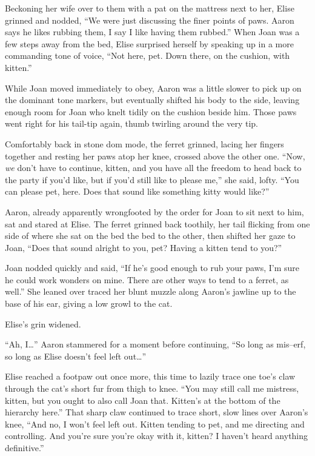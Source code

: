 Beckoning her wife over to them with a pat on the mattress next to her, Elise grinned and nodded, ``We were just discussing the finer points of paws. Aaron says he likes rubbing them, I say I like having them rubbed.'' When Joan was a few steps away from the bed, Elise surprised herself by speaking up in a more commanding tone of voice, ``Not here, pet. Down there, on the cushion, with kitten.''

While Joan moved immediately to obey, Aaron was a little slower to pick up on the dominant tone markers, but eventually shifted his body to the side, leaving enough room for Joan who knelt tidily on the cushion beside him. Those paws went right for his tail-tip again, thumb twirling around the very tip.

Comfortably back in stone dom mode, the ferret grinned, lacing her fingers together and resting her paws atop her knee, crossed above the other one. ``Now, \textit{we} don't have to continue, kitten, and you have all the freedom to head back to the party if you'd like, but if you'd still like to please me,'' she said, lofty. ``You can please pet, here. Does that sound like something kitty would like?''

Aaron, already apparently wrongfooted by the order for Joan to sit next to him, sat and stared at Elise. The ferret grinned back toothily, her tail flicking from one side of where she sat on the bed the bed to the other, then shifted her gaze to Joan, ``Does that sound alright to you, pet? Having a kitten tend to you?''

Joan nodded quickly and said, ``If he's good enough to rub your paws, I'm sure he could work wonders on mine. There are other ways to tend to a ferret, as well.'' She leaned over traced her blunt muzzle along Aaron's jawline up to the base of his ear, giving a low growl to the cat.

Elise's grin widened.

``Ah, I\ldots{}'' Aaron stammered for a moment before continuing, ``So long as mis--erf, so long as Elise doesn't feel left out\ldots{}''

Elise reached a footpaw out once more, this time to lazily trace one toe's claw through the cat's short fur from thigh to knee. ``You may still call me mistress, kitten, but you ought to also call Joan that. Kitten's at the bottom of the hierarchy here.'' That sharp claw continued to trace short, slow lines over Aaron's knee, ``And no, I won't feel left out. Kitten tending to pet, and me directing and controlling. And you're sure you're okay with it, kitten? I haven't heard anything definitive.''

